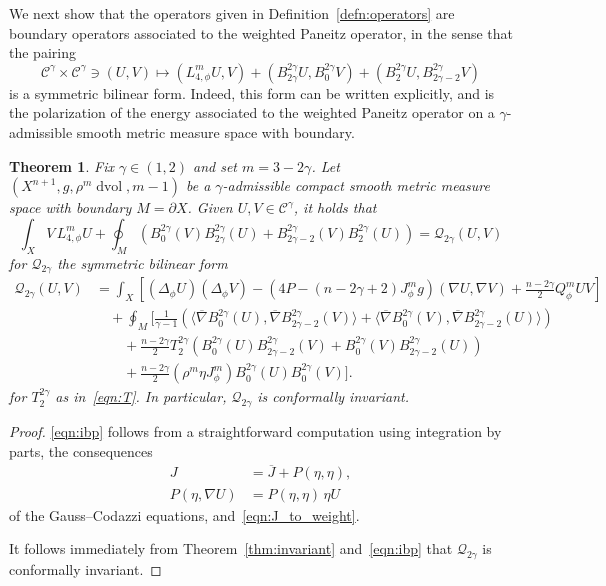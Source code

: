 \documentclass{amsart}
\newtheorem{thm}{Theorem}[section]
\theoremstyle{definition}
\theoremstyle{remark}
\numberwithin{equation}{section}
\begin{document}
We next show that the operators given in Definition~\ref{defn:operators} are boundary operators associated to the weighted Paneitz operator, in the sense that the pairing
\[ {\mathcal{C}}^\gamma\times{\mathcal{C}}^\gamma \ni (U,V) \mapsto \left(L_{4,\phi}^mU,V\right) + \left(B_{2\gamma}^{2\gamma}U,B_{0}^{2\gamma}V\right) + \left(B_{2}^{2\gamma}U,B_{2\gamma-2}^{2\gamma}V\right) \]
is a symmetric bilinear form.  Indeed, this form can be written explicitly, and is the polarization of the energy associated to the weighted Paneitz operator on a $\gamma$-admissible smooth metric measure space with boundary.

\begin{thm}
 \label{thm:integral}
 Fix $\gamma\in(1,2)$ and set $m=3-2\gamma$.  Let $(X^{n+1},g,\rho^m\operatorname{dvol},m-1)$ be a $\gamma$-admissible compact smooth metric measure space with boundary $M=\partial X$.  Given $U,V\in{\mathcal{C}}^\gamma$, it holds that
 \begin{equation}
  \label{eqn:ibp}
  \int_X V\,L_{4,\phi}^mU + \oint_M \left( B_0^{2\gamma}(V)B_{2\gamma}^{2\gamma}(U) + B_{2\gamma-2}^{2\gamma}(V)B_2^{2\gamma}(U)\right) = {\mathcal{Q}}_{2\gamma}(U,V)
 \end{equation}
 for ${\mathcal{Q}}_{2\gamma}$ the symmetric bilinear form
 \begin{align*}
  {\mathcal{Q}}_{2\gamma}(U,V) & = \int_X \left[ \left(\Delta_\phi U\right)\left(\Delta_\phi V\right)  - \left(4P-(n-2\gamma+2)J_\phi^mg\right)(\nabla U,\nabla V) + \frac{n-2\gamma}{2}Q_\phi^mUV \right] \\
  & \quad + \oint_M \biggl[ \frac{1}{\gamma-1}\left( {\langle}{\overline{\nabla}} B_{0}^{2\gamma}(U),{\overline{\nabla}} B_{2\gamma-2}^{2\gamma}(V){\rangle} + {\langle}{\overline{\nabla}} B_{0}^{2\gamma}(V),{\overline{\nabla}} B_{2\gamma-2}^{2\gamma}(U){\rangle}\right) \\
  & \qquad + \frac{n-2\gamma}{2}T_{2}^{2\gamma}\left(B_{0}^{2\gamma}(U)B_{2\gamma-2}^{2\gamma}(V) + B_{0}^{2\gamma}(V)B_{2\gamma-2}^{2\gamma}(U)\right) \\
  & \qquad + \frac{n-2\gamma}{2}\left(\rho^m\eta J_\phi^m\right)B_{0}^{2\gamma}(U)B_{0}^{2\gamma}(V) \biggr] .
 \end{align*}
 for $T_{2}^{2\gamma}$ as in~\eqref{eqn:T}.  In particular, ${\mathcal{Q}}_{2\gamma}$ is conformally invariant.
\end{thm}

\begin{proof}
 \eqref{eqn:ibp} follows from a straightforward computation using integration by parts, the consequences
 \begin{equation}
  \label{eqn:gauss_codazzi}
  \begin{split}
   J & = {\overline{J}} + P(\eta,\eta) , \\
   P(\eta,\nabla U) & = P(\eta,\eta)\,\eta U
  \end{split}
 \end{equation}
 of the Gauss--Codazzi equations, and~\eqref{eqn:J_to_weight}.
 
 It follows immediately from Theorem~\ref{thm:invariant} and~\eqref{eqn:ibp} that ${\mathcal{Q}}_{2\gamma}$ is conformally invariant.
\end{proof}
\end{document}
